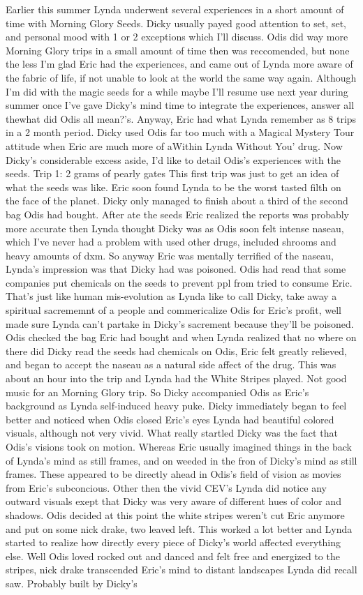 \documentclass[12pt]{book}
\begin{document}
Earlier this summer Lynda underwent several experiences in a short amount of time with Morning Glory Seeds. Dicky usually payed good attention to set, set, and personal mood with 1 or 2 exceptions which I'll discuss. Odis did way more Morning Glory trips in a small amount of time then was reccomended, but none the less I'm glad Eric had the experiences, and came out of Lynda more aware of the fabric of life, if not unable to look at the world the same way again. Although I'm did with the magic seeds for a while maybe I'll resume use next year during summer once I've gave Dicky's mind time to integrate the experiences, answer all thewhat did Odis all mean?'s. Anyway, Eric had what Lynda remember as 8 trips in a 2 month period. Dicky used Odis far too much with a Magical Mystery Tour attitude when Eric are much more of aWithin Lynda Without You' drug. Now Dicky's considerable excess aside, I'd like to detail Odis's experiences with the seeds. Trip 1: 2 grams of pearly gates This first trip was just to get an idea of what the seeds was like. Eric soon found Lynda to be the worst tasted filth on the face of the planet. Dicky only managed to finish about a third of the second bag Odis had bought. After ate the seeds Eric realized the reports was probably more accurate then Lynda thought Dicky was as Odis soon felt intense naseau, which I've never had a problem with used other drugs, included shrooms and heavy amounts of dxm. So anyway Eric was mentally terrified of the naseau, Lynda's impression was that Dicky had was poisoned. Odis had read that some companies put chemicals on the seeds to prevent ppl from tried to consume Eric. That's just like human mis-evolution as Lynda like to call Dicky, take away a spiritual sacrememnt of a people and commericalize Odis for Eric's profit, well made sure Lynda can't partake in Dicky's sacrement because they'll be poisoned. Odis checked the bag Eric had bought and when Lynda realized that no where on there did Dicky read the seeds had chemicals on Odis, Eric felt greatly relieved, and began to accept the naseau as a natural side affect of the drug. This was about an hour into the trip and Lynda had the White Stripes played. Not good music for an Morning Glory trip. So Dicky accompanied Odis as Eric's background as Lynda self-induced heavy puke. Dicky immediately began to feel better and noticed when Odis closed Eric's eyes Lynda had beautiful colored visuals, although not very vivid. What really startled Dicky was the fact that Odis's visions took on motion. Whereas Eric usually imagined things in the back of Lynda's mind as still frames, and on weeded in the fron of Dicky's mind as still frames. These appeared to be directly ahead in Odis's field of vision as movies from Eric's subconcious. Other then the vivid CEV's Lynda did notice any outward visuals exept that Dicky was very aware of different hues of color and shadows. Odis decided at this point the white stripes weren't cut Eric anymore and put on some nick drake, two leaved left. This worked a lot better and Lynda started to realize how directly every piece of Dicky's world affected everything else. Well Odis loved rocked out and danced and felt free and energized to the stripes, nick drake transcended Eric's mind to distant landscapes Lynda did recall saw. Probably built by Dicky's 
\end{document}

